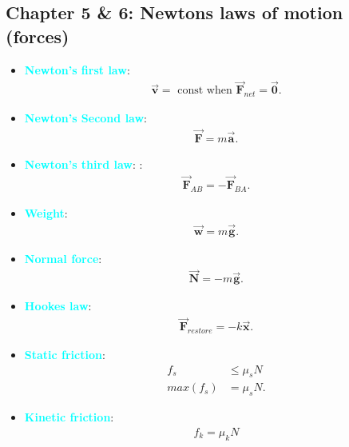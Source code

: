 \documentclass{report}
\begin{document}
    \subsection{Chapter 5 \& 6: Newtons laws of motion (forces)}
    \begin{itemize}
        \item \textbf{\textcolor{cyan}{Newton's first law}}:
            \begin{align*}
                \vec{\mathbf{v}} = \text{ const when } \vec{\mathbf{F}}_{net} = \vec{\mathbf{0}}
            .\end{align*}
        \item \textbf{\textcolor{cyan}{Newton's Second law}}: 
            \begin{align*}
                \vec{\mathbf{F}} = m\vec{\mathbf{a}}
            .\end{align*}
        \item \textbf{\textcolor{cyan}{Newton's third law}}: :
            \begin{align*}
                \vec{\mathbf{F}}_{AB} = -\vec{\mathbf{F}}_{BA}
            .\end{align*}
        \item \textbf{\textcolor{cyan}{Weight}}:
            \begin{align*}
                \vec{\mathbf{w}} = m\vec{\mathbf{g}}
            .\end{align*}
        \item \textbf{\textcolor{cyan}{Normal force}}:
            \begin{align*}
                \vec{\mathbf{N}} = - m\vec{\mathbf{g}}
            .\end{align*}
        \item \textbf{\textcolor{cyan}{Hookes law}}:
            \begin{align*}
                \vec{\mathbf{F}}_{restore} = -k\vec{\mathbf{x}}
            .\end{align*}
        \item \textbf{\textcolor{cyan}{Static friction}}:
            \begin{align*}
                f_{s} &\leq \mu_{s}N \\
                max(f_{s}) &= \mu_{s}N
            .\end{align*}
        \item \textbf{\textcolor{cyan}{Kinetic friction}}:
            \begin{align*}
                f_{k} = \mu_{k}N

\end{align*}
\end{itemize}
\end{document}
